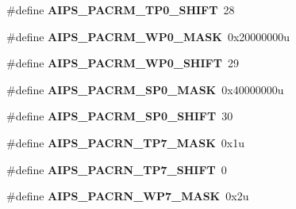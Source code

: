 \begin{DoxyCompactItemize}
\item 
\#define {\bfseries A\+I\+P\+S\+\_\+\+P\+A\+C\+R\+M\+\_\+\+T\+P0\+\_\+\+S\+H\+I\+FT}~28\hypertarget{group__AIPS__Register__Masks_gaab4c4798ee2231b2e398cf39674305b6}{}\label{group__AIPS__Register__Masks_gaab4c4798ee2231b2e398cf39674305b6}

\item 
\#define {\bfseries A\+I\+P\+S\+\_\+\+P\+A\+C\+R\+M\+\_\+\+W\+P0\+\_\+\+M\+A\+SK}~0x20000000u\hypertarget{group__AIPS__Register__Masks_ga84cec7a6c9667f54a37bba5beb64e032}{}\label{group__AIPS__Register__Masks_ga84cec7a6c9667f54a37bba5beb64e032}

\item 
\#define {\bfseries A\+I\+P\+S\+\_\+\+P\+A\+C\+R\+M\+\_\+\+W\+P0\+\_\+\+S\+H\+I\+FT}~29\hypertarget{group__AIPS__Register__Masks_ga92388c5bbb649738993d066ce8755f2b}{}\label{group__AIPS__Register__Masks_ga92388c5bbb649738993d066ce8755f2b}

\item 
\#define {\bfseries A\+I\+P\+S\+\_\+\+P\+A\+C\+R\+M\+\_\+\+S\+P0\+\_\+\+M\+A\+SK}~0x40000000u\hypertarget{group__AIPS__Register__Masks_gaeeebe0a8259e971ab63d9ce8a1576bd2}{}\label{group__AIPS__Register__Masks_gaeeebe0a8259e971ab63d9ce8a1576bd2}

\item 
\#define {\bfseries A\+I\+P\+S\+\_\+\+P\+A\+C\+R\+M\+\_\+\+S\+P0\+\_\+\+S\+H\+I\+FT}~30\hypertarget{group__AIPS__Register__Masks_ga46922ecc0b641603107573cba7a84dc1}{}\label{group__AIPS__Register__Masks_ga46922ecc0b641603107573cba7a84dc1}

\item 
\#define {\bfseries A\+I\+P\+S\+\_\+\+P\+A\+C\+R\+N\+\_\+\+T\+P7\+\_\+\+M\+A\+SK}~0x1u\hypertarget{group__AIPS__Register__Masks_gaec5f089f628c32d399bbe6ed2e3dfcc9}{}\label{group__AIPS__Register__Masks_gaec5f089f628c32d399bbe6ed2e3dfcc9}

\item 
\#define {\bfseries A\+I\+P\+S\+\_\+\+P\+A\+C\+R\+N\+\_\+\+T\+P7\+\_\+\+S\+H\+I\+FT}~0\hypertarget{group__AIPS__Register__Masks_ga04cafa9eff42e145fece56b997ae83ee}{}\label{group__AIPS__Register__Masks_ga04cafa9eff42e145fece56b997ae83ee}

\item 
\#define {\bfseries A\+I\+P\+S\+\_\+\+P\+A\+C\+R\+N\+\_\+\+W\+P7\+\_\+\+M\+A\+SK}~0x2u\hypertarget{group__AIPS__Register__Masks_ga1000a4bd55fe0e5f30e82344f18c24c5}{}\label{group__AIPS__Register__Masks_ga1000a4bd55fe0e5f30e82344f18c24c5}


\end{DoxyCompactItemize}

